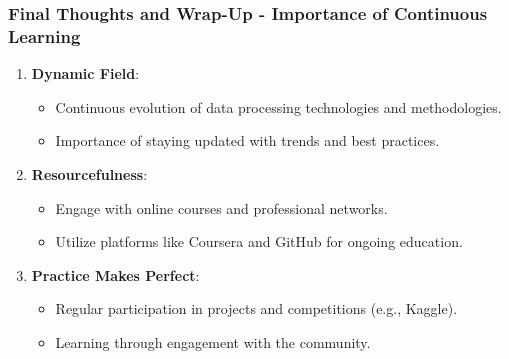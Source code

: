 \documentclass[aspectratio=169]{beamer}
\begin{document}
\begin{frame}[fragile]
  \frametitle{Final Thoughts and Wrap-Up - Importance of Continuous Learning}
  \begin{enumerate}
    \item \textbf{Dynamic Field}:
      \begin{itemize}
        \item Continuous evolution of data processing technologies and methodologies.
        \item Importance of staying updated with trends and best practices.
      \end{itemize}

    \item \textbf{Resourcefulness}:
      \begin{itemize}
        \item Engage with online courses and professional networks.
        \item Utilize platforms like Coursera and GitHub for ongoing education.
      \end{itemize}

    \item \textbf{Practice Makes Perfect}:
      \begin{itemize}
        \item Regular participation in projects and competitions (e.g., Kaggle).
        \item Learning through engagement with the community.
      \end{itemize}
  \end{enumerate}
\end{frame}
\end{document}
